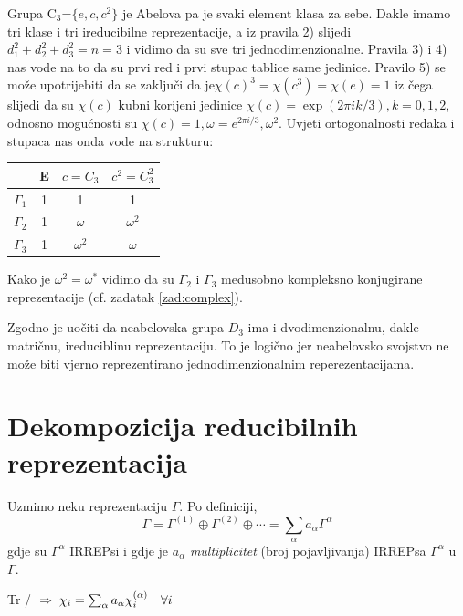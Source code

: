\begin{primjer}

Grupa C$_3$=$\{e, c, c^2\}$ je Abelova pa je svaki element klasa za sebe.
Dakle imamo tri klase i tri ireducibilne reprezentacije,
a iz pravila 2) slijedi $d_{1}^2+d_{2}^2+d_{3}^2 = n =3$
i vidimo da su sve tri jednodimenzionalne.
Pravila 3) i 4) nas vode na to da su prvi red i prvi stupac
tablice same jedinice.
Pravilo 5) se može upotrijebiti da se zaključi da
je$\chi(c)^3=\chi(c^3)=\chi(e)=1$ iz čega slijedi da su $\chi(c)$
kubni korijeni jedinice $\chi(c) = \exp(2\pi i k/3), k=0, 1, 2$,
odnosno mogućnosti su $\chi(c)=1, \omega=e^{2\pi i/3}, \omega^2$.
Uvjeti ortogonalnosti redaka i stupaca nas onda vode na
strukturu:
\begin{center}
\begin{tabular}{c|ccc}
  & E & $c=C_3$  & $c^2=C_{3}^2$ \\ \hline
$\Gamma_{1}$ & 1 & 1& 1 \\
$\Gamma_{2}$  & 1 & $\omega$ &$\omega^2$  \\
$\Gamma_{3}$  & 1 &$\omega^2$ & $\omega$ 
\end{tabular}
\end{center}
Kako je $\omega^2 = \omega^* $ vidimo da
su $\Gamma_2$ i $\Gamma_3$ međusobno kompleksno
konjugirane reprezentacije (cf. zadatak \ref{zad:complex}).
\end{primjer}


Zgodno je uočiti da neabelovska grupa $D_3$ ima i dvodimenzionalnu, dakle matričnu,
ireduciblinu reprezentaciju. To je logično jer neabelovsko svojstvo ne može biti
vjerno reprezentirano jednodimenzionalnim reperezentacijama.

\section{Dekompozicija reducibilnih reprezentacija}

Uzmimo neku reprezentaciju $\Gamma$. Po definiciji,
\begin{displaymath}
  \Gamma = \Gamma^{(1)}\oplus\Gamma^{(2)}\oplus\cdots =
     \sum_{\alpha}  a_{\alpha} \Gamma^{\alpha}
\end{displaymath}
gdje su $\Gamma^{\alpha}$ IRREPsi i
gdje je $a_{\alpha}$ \emph{multiplicitet} (broj pojavljivanja) 
IRREPsa $\Gamma^{\alpha}$ u $\Gamma$.


Tr / $ \;\Rightarrow\;  \chi_i = \sum_{\alpha}  a_{\alpha} \chi^{(\alpha)}_i \quad 
  \forall i$

